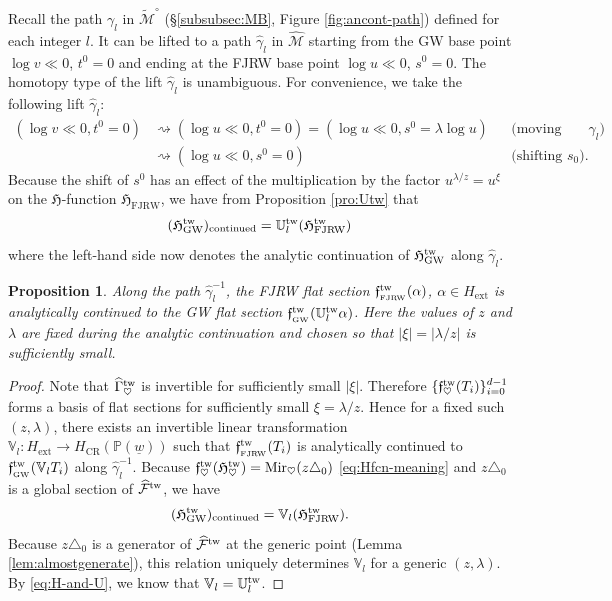 \documentclass[11pt]{amsart}
\newtheorem{pro}[thm]{Proposition} %
\theoremstyle{definition} %
\theoremstyle{remark} %
\newcommand{\PP}{\mathbb P}
\newcommand{\UU}{\mathbb U}
\newcommand{\VV}{\mathbb V}
\newcommand{\tw}{{\rm tw}}
\def\GW{\operatorname{\text{GW}}}
\def\CR{\operatorname{\text{CR}}}
\newcommand{\cM}{\mathcal{M}}
\newcommand{\hcM}{\widehat{\cM}}
\newcommand{\tcMo}{\widetilde{\cM}^\circ}
\newcommand{\cF}{\mathcal{F}}
\newcommand{\hcF}{\widehat{\cF}}
\newcommand{\frf}{\mathfrak{f}}
\newcommand{\ext}{{\operatorname{ext}}}
\newcommand{\FJRW}{{\operatorname{FJRW}}}
\newcommand{\sFJRW}{\operatorname{_{FJRW}}}
\renewcommand{\GW}{{\operatorname{GW}}}
\renewcommand{\CR}{{\operatorname{CR}}}
\newcommand{\sGW}{\operatorname{_{GW}}}
\newcommand{\Mir}{\operatorname{Mir}}
\newcommand{\hGamma}{\widehat{\Gamma}}
\newcommand{\hgamma}{\hat{\gamma}}
\newcommand{\Hf}{{\mathfrak{H}}}
\newcommand{\uw}{\underline{w}}
\begin{document}
Recall the path $\gamma_l$ in $\tcMo$
(\S \ref{subsubsec:MB}, Figure \ref{fig:ancont-path}) 
defined for each integer $l$.  
It can be lifted to a path $\hgamma_l$ in $\hcM$ starting 
from the GW base point $\log v \ll 0$, $t^0=0$ 
and ending at the FJRW base point $\log u\ll 0$, $s^0=0$.  
The homotopy type of the lift $\hgamma_l$ is unambiguous. 
For convenience, we take the following lift $\hgamma_l$: 
\begin{align*} 
(\log v\ll 0, t^0 =0) 
& \rightsquigarrow 
( \log u\ll 0, t^0 =0) 
= (\log u\ll 0, s^0 =\lambda \log u)  
& &\text{(moving along $\gamma_l$)} 
\\
& \rightsquigarrow  
(\log u \ll 0, s^0 =0) 
& &\text{(shifting $s_0$).} 
\end{align*} 
Because the shift of $s^0$ has an effect of 
the multiplication by the factor 
$u^{\lambda/z} = u^{\xi}$ 
on the $\Hf$-function $\Hf_{\FJRW}$, 
we have from Proposition \ref{pro:Utw} that 
\begin{equation} 
\label{eq:H-and-U}
(\Hf_{\GW}^\tw)_{\rm continued} = \UU_l^\tw (\Hf_{\FJRW}^\tw) 
\end{equation} 
where the left-hand side now 
denotes the analytic continuation 
of $\Hf^\tw_{\GW}$ along $\hgamma_l$.  
\begin{pro} 
\label{pro:Utw-flatsection} 
Along the path $\hgamma_l^{-1}$, 
the FJRW flat section 
$\frf^\tw_{\sFJRW}(\alpha)$, $\alpha \in H_{\ext}$ 
is analytically continued to the GW flat section 
$\frf^\tw_{\sGW}(\UU^\tw_l \alpha)$.  
Here the values of $z$ and $\lambda$ are fixed during 
the analytic continuation and chosen so that 
$|\xi| = |\lambda/z|$ is sufficiently small. 
\end{pro} 
\begin{proof} 
Note that $\hGamma^\tw_{\heartsuit}$ is invertible for 
sufficiently small $|\xi|$.  
Therefore $\{\frf^\tw_\heartsuit(T_i)\}_{i=0}^{d-1}$ forms  
a basis of flat sections for sufficiently small $\xi=\lambda/z$.  
Hence for a fixed such $(z,\lambda)$, 
there exists an invertible linear transformation 
$\VV_l \colon H_{\ext} \to H_{\CR}(\PP(\uw))$ 
such that $\frf^\tw_{\sFJRW}(T_i)$ 
is analytically continued to $\frf^\tw_{\sGW}(\VV_l T_i)$ 
along $\hgamma_l^{-1}$. 
Because $\frf^\tw_\heartsuit(\Hf^\tw_\heartsuit) 
= \Mir_\heartsuit(z \triangle_0)$ \eqref{eq:Hfcn-meaning} 
and $z \triangle_0$ is a global section of $\hcF^\tw$, we have 
\[
(\Hf^\tw_{\GW})_{\rm continued} = \VV_l (\Hf^\tw_{\FJRW}). 
\]
Because $z\triangle_0$ is a generator of $\hcF^\tw$ 
at the generic point (Lemma \ref{lem:almostgenerate}), 
this relation uniquely determines $\VV_l$ 
for a generic $(z,\lambda)$. 
By \eqref{eq:H-and-U}, we know that $\VV_l = \UU_l^\tw$. 
\end{proof} 
\end{document}
